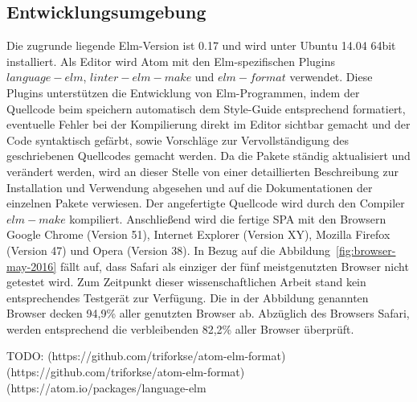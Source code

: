\subsection{Entwicklungsumgebung}
\label{sec:Entwicklungsumgebung}
Die zugrunde liegende Elm-Version ist 0.17 und wird unter Ubuntu 14.04 64bit installiert. Als Editor wird Atom mit den Elm-spezifischen Plugins $language-elm$, $linter-elm-make$ und $elm-format$ verwendet. Diese Plugins unterstützen die Entwicklung von Elm-Programmen, indem der Quellcode beim speichern automatisch dem Style-Guide entsprechend formatiert, eventuelle Fehler bei der Kompilierung direkt im Editor sichtbar gemacht und der Code syntaktisch gefärbt, sowie Vorschläge zur Vervollständigung des geschriebenen Quellcodes gemacht werden. Da die Pakete ständig aktualisiert und verändert werden, wird an dieser Stelle von einer detaillierten Beschreibung zur Installation und Verwendung abgesehen und auf die Dokumentationen der einzelnen Pakete verwiesen.
Der angefertigte Quellcode wird durch den Compiler $elm-make$ kompiliert.
Anschließend wird die fertige \ac{SPA} mit den Browsern Google Chrome (Version 51), Internet Explorer (Version XY), Mozilla Firefox (Version 47) und Opera (Version 38). In Bezug auf die Abbildung~\ref{fig:browser-may-2016} fällt auf, dass Safari als einziger der fünf meistgenutzten Browser nicht getestet wird. Zum Zeitpunkt dieser wissenschaftlichen Arbeit stand kein entsprechendes Testgerät zur Verfügung. Die in der Abbildung genannten Browser decken 94,9\% aller genutzten Browser ab. Abzüglich des Browsers Safari, werden entsprechend die verbleibenden 82,2\% aller Browser überprüft.


TODO: (https://github.com/triforkse/atom-elm-format)\\
(https://github.com/triforkse/atom-elm-format)\\
(https://atom.io/packages/language-elm\\

